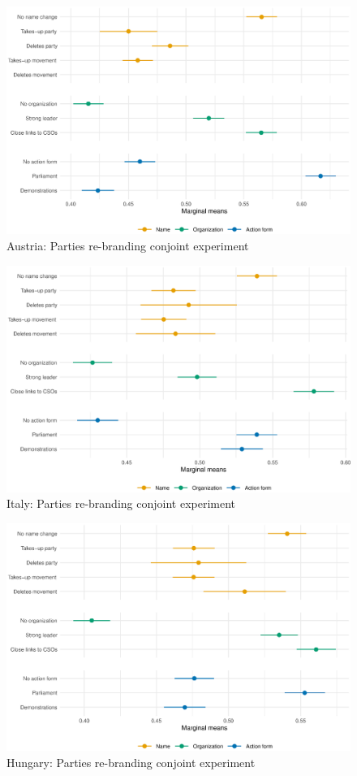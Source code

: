 \documentclass[12pt]{article}
\begin{document}
\begin{figure}[H]
\includegraphics[width=\textwidth]{./Figures/CJ2_main_tradeoff_Austria.eps}
\caption{Austria: Parties re-branding conjoint experiment}
\end{figure}

\begin{figure}[H]
\includegraphics[width=\textwidth]{./Figures/CJ2_main_tradeoff_Italy.eps}
\caption{Italy: Parties re-branding conjoint experiment}
\end{figure}

\begin{figure}[H]
\includegraphics[width=\textwidth]{./Figures/CJ2_main_tradeoff_Hungary.eps}
\caption{Hungary: Parties re-branding conjoint experiment}
\end{figure}
\end{document}
